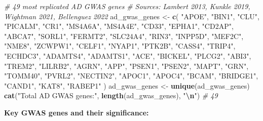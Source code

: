 \documentclass[
]{article}
\newenvironment{Shaded}{\begin{snugshade}}{\end{snugshade}}
\newcommand{\CommentTok}[1]{\textcolor[rgb]{0.56,0.35,0.01}{\textit{#1}}}
\newcommand{\FunctionTok}[1]{\textcolor[rgb]{0.13,0.29,0.53}{\textbf{#1}}}
\newcommand{\NormalTok}[1]{#1}
\newcommand{\OtherTok}[1]{\textcolor[rgb]{0.56,0.35,0.01}{#1}}
\newcommand{\SpecialCharTok}[1]{\textcolor[rgb]{0.81,0.36,0.00}{\textbf{#1}}}
\newcommand{\StringTok}[1]{\textcolor[rgb]{0.31,0.60,0.02}{#1}}
\begin{document}
\begin{Shaded}
\begin{Highlighting}[]
\CommentTok{\# 49 most replicated AD GWAS genes}
\CommentTok{\# Sources: Lambert 2013, Kunkle 2019, Wightman 2021, Bellenguez 2022}
\NormalTok{ad\_gwas\_genes }\OtherTok{\textless{}{-}} \FunctionTok{c}\NormalTok{(}
    \StringTok{"APOE"}\NormalTok{, }\StringTok{"BIN1"}\NormalTok{, }\StringTok{"CLU"}\NormalTok{, }\StringTok{"PICALM"}\NormalTok{, }\StringTok{"CR1"}\NormalTok{,}
    \StringTok{"MS4A6A"}\NormalTok{, }\StringTok{"MS4A4E"}\NormalTok{, }\StringTok{"CD33"}\NormalTok{, }\StringTok{"EPHA1"}\NormalTok{, }\StringTok{"CD2AP"}\NormalTok{,}
    \StringTok{"ABCA7"}\NormalTok{, }\StringTok{"SORL1"}\NormalTok{, }\StringTok{"FERMT2"}\NormalTok{, }\StringTok{"SLC24A4"}\NormalTok{, }\StringTok{"RIN3"}\NormalTok{,}
    \StringTok{"INPP5D"}\NormalTok{, }\StringTok{"MEF2C"}\NormalTok{, }\StringTok{"NME8"}\NormalTok{, }\StringTok{"ZCWPW1"}\NormalTok{, }\StringTok{"CELF1"}\NormalTok{,}
    \StringTok{"NYAP1"}\NormalTok{, }\StringTok{"PTK2B"}\NormalTok{, }\StringTok{"CASS4"}\NormalTok{, }\StringTok{"TRIP4"}\NormalTok{, }\StringTok{"ECHDC3"}\NormalTok{,}
    \StringTok{"ADAMTS4"}\NormalTok{, }\StringTok{"ADAMTS1"}\NormalTok{, }\StringTok{"ACE"}\NormalTok{, }\StringTok{"BICKEL"}\NormalTok{, }\StringTok{"PLCG2"}\NormalTok{,}
    \StringTok{"ABI3"}\NormalTok{, }\StringTok{"TREM2"}\NormalTok{, }\StringTok{"LILRB2"}\NormalTok{, }\StringTok{"AGRN"}\NormalTok{, }\StringTok{"APP"}\NormalTok{,}
    \StringTok{"PSEN1"}\NormalTok{, }\StringTok{"PSEN2"}\NormalTok{, }\StringTok{"MAPT"}\NormalTok{, }\StringTok{"GRN"}\NormalTok{, }\StringTok{"TOMM40"}\NormalTok{,}
    \StringTok{"PVRL2"}\NormalTok{, }\StringTok{"NECTIN2"}\NormalTok{, }\StringTok{"APOC1"}\NormalTok{, }\StringTok{"APOC4"}\NormalTok{, }\StringTok{"BCAM"}\NormalTok{,}
    \StringTok{"BRIDGE1"}\NormalTok{, }\StringTok{"CAND1"}\NormalTok{, }\StringTok{"KAT8"}\NormalTok{, }\StringTok{"RABEP1"}
\NormalTok{)}
\NormalTok{ad\_gwas\_genes }\OtherTok{\textless{}{-}} \FunctionTok{unique}\NormalTok{(ad\_gwas\_genes)}
\FunctionTok{cat}\NormalTok{(}\StringTok{"Total AD GWAS genes:"}\NormalTok{, }\FunctionTok{length}\NormalTok{(ad\_gwas\_genes), }\StringTok{"}\SpecialCharTok{\textbackslash{}n}\StringTok{"}\NormalTok{)  }\CommentTok{\# 49}
\end{Highlighting}
\end{Shaded}

\textbf{Key GWAS genes and their significance:}
\end{document}
